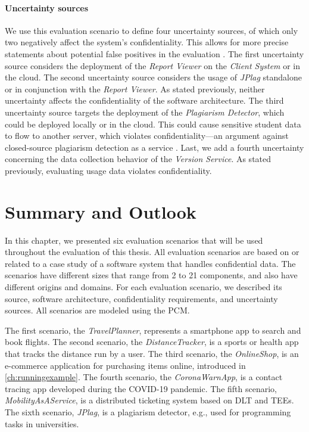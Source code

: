 \paragraph{Uncertainty sources}
We use this evaluation scenario to define four uncertainty sources, of which only two negatively affect the system's confidentiality.
This allows for more precise statements about potential false positives in the evaluation \cite{powers_evaluation_2011}.
The first uncertainty source considers the deployment of the \emph{Report Viewer} on the \emph{Client System} or in the cloud.
The second uncertainty source considers the usage of \emph{JPlag} standalone or in conjunction with the \emph{Report Viewer}.
As stated previously, neither uncertainty affects the confidentiality of the software architecture.
The third uncertainty source targets the deployment of the \emph{Plagiarism Detector}, which could be deployed locally or in the cloud.
This could cause sensitive student data to flow to another server, which violates confidentiality---an argument against closed-source plagiarism detection as a service \cite{saglam_obfuscation-resilient_2024,saglam_jplag_2024}.
Last, we add a fourth uncertainty concerning the data collection behavior of the \emph{Version Service}.
As stated previously, evaluating usage data violates confidentiality.





\section{Summary and Outlook}%
\label{sec:evaluationscenarios:summary}

In this chapter, we presented six evaluation scenarios that will be used throughout the evaluation of this thesis.
All evaluation scenarios are based on or related to a case study of a software system that handles confidential data.
The scenarios have different sizes that range from 2 to 21 components, and also have different origins and domains.
For each evaluation scenario, we described its source, software architecture, confidentiality requirements, and uncertainty sources.
All scenarios are modeled using the \ac{PCM}.

The first scenario, the \emph{TravelPlanner}, represents a smartphone app to search and book flights.
The second scenario, the \emph{DistanceTracker}, is a sports or health app that tracks the distance run by a user.
The third scenario, the \emph{OnlineShop}, is an e-commerce application for purchasing items online, introduced in \autoref{ch:runningexample}.
The fourth scenario, the \emph{CoronaWarnApp}, is a contact tracing app developed during the COVID-19 pandemic.
The fifth scenario, \emph{MobilityAsAService}, is a distributed ticketing system based on \ac{DLT} and \acp{TEE}.
The sixth scenario, \emph{JPlag}, is a plagiarism detector, e.g., used for programming tasks in universities.

